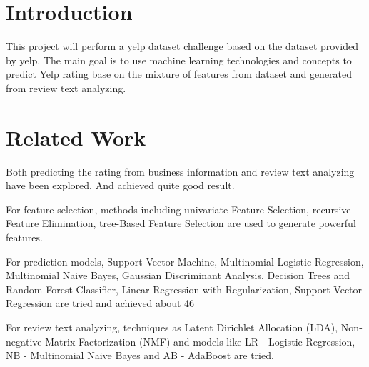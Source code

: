 \documentclass{article}
\begin{document}
 


\section{Introduction}


This project will perform a yelp dataset challenge based on the dataset provided by yelp. The main goal is to use machine learning technologies and concepts to predict Yelp rating base on the mixture of features from dataset and generated from review text analyzing. 

\section{Related Work}

Both predicting the rating from business information and review text analyzing have been explored. And achieved quite good result. 

For feature selection, methods including univariate Feature Selection, recursive Feature Elimination, tree-Based Feature Selection are used to generate powerful features. 

For prediction models, Support Vector Machine, Multinomial Logistic Regression, Multinomial Naive Bayes, Gaussian Discriminant Analysis, Decision Trees and Random Forest Classifier, Linear Regression with Regularization, Support Vector Regression are tried and achieved about 46%

For review text analyzing, techniques as Latent Dirichlet Allocation (LDA), Non-negative Matrix Factorization (NMF) and models like LR - Logistic Regression, NB - Multinomial Naive Bayes and  AB - AdaBoost are tried. 
\end{document}
